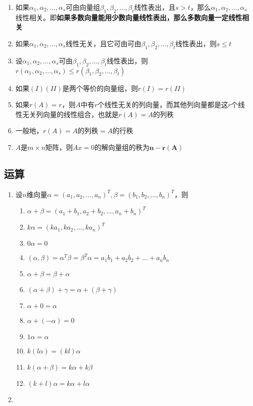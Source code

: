 \documentclass[a4paper,12pt]{article}
\begin{document}
\begin{enumerate}
        \item 如果$\alpha_1, \alpha_2, \dots, \alpha_s$可由向量组$\beta_1, \beta_2, \dots, \beta_t$线性表出，且$s > t$，那么$\alpha_1, \alpha_2, \dots, \alpha_s$线性相关。即\textbf{如果多数向量能用少数向量线性表出，那么多数向量一定线性相关}
        \item 如果$\alpha_1, \alpha_2, \dots, \alpha_s$线性无关，且它可由可由$\beta_1, \beta_2, \dots, \beta_t$线性表出，则$s \le t$
        \item 设$\alpha_1, \alpha_2, \dots, \alpha_s$可由$\beta_1, \beta_2, \dots, \beta_t$线性表出，则$r(\alpha_1, \alpha_2, \dots, \alpha_s) \le r(\beta_1, \beta_2, \dots, \beta_t)$
        \item 如果$(I)(II)$是两个等价的向量组，则$r(I) = r(II)$
        \item 如果$r(A) = r$，则$A$中有$r$个线性无关的列向量，而其他列向量都是这$r$个线性无关列向量的线性组合，也就是$r(A) = A$的列秩
        \item 一般地，$r(A) = A \text{的列秩} = A \text{的行秩}$
        \item $A$是$m \times n$矩阵，则$Ax = 0$的解向量组的秩为$\mathbf{n - r(A)}$
    \end{enumerate}

    \subsection{运算}

    \begin{enumerate}
        \item 设$n$维向量$\alpha = (a_1, a_2, \dots, a_n)^T, \beta= (b_1, b_2, \dots, b_n)^T$，则
        \begin{enumerate}
            \item $\alpha + \beta = (a_1 + b_1, a_2 + b_2, \dots, a_n + b_n)^T$
            \item $k\alpha = (ka_1, ka_2, \dots, ka_n)^T$
            \item $0\alpha = 0$
            \item $(\alpha, \beta) = \alpha^T\beta = \beta^T\alpha = a_{1}b_{1} + a_{2}b_{2} + \dots + a_{n}b_{n}$
            \item $\alpha + \beta = \beta + \alpha$
            \item $(\alpha + \beta) + \gamma = \alpha + (\beta + \gamma)$
            \item $\alpha + 0 = \alpha $
            \item $\alpha + (-\alpha) = 0$
            \item $1\alpha = \alpha$
            \item $k(l\alpha) = (kl)\alpha$
            \item $k(\alpha + \beta) = k\alpha + k\beta$
            \item $(k + l)\alpha = k\alpha + l\alpha$
        \end{enumerate}
        \item
    \end{enumerate}
\end{document}

